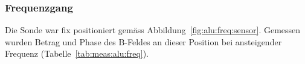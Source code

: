 

{%
    \clearpage
    \pdfpagewidth
	\textwidth
    \addtolength{\textwidth}{70mm}


    \subsubsection{Frequenzgang}
    \label{sec:ausw:subsec:hohlz:subsubsec:steel}

	\begin{minipage}[t]{0.33\textwidth}
        \vspace{0pt}
        Die       Sonde       war        fix       positioniert       gem\"ass
        Abbildung~\ref{fig:alu:freq:sensor}. Gemessen   wurden    Betrag   und
        Phase  des  B-Feldes  an  dieser Position  bei  ansteigender  Frequenz
        (Tabelle~\ref{tab:meas:alu:freq}).



\end{minipage}}

